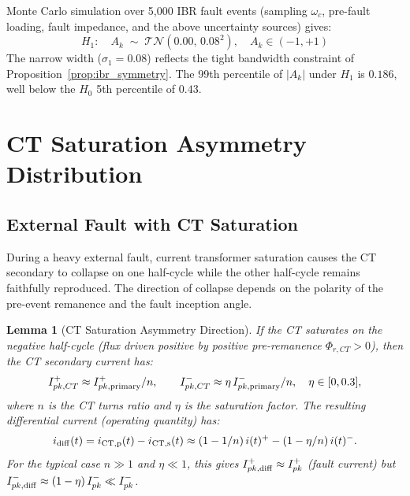 \documentclass[11pt, a4paper]{article}
\newtheorem{lemma}{Lemma}
\newcommand{\Ak}{A_k}
\newcommand{\TN}[2]{\mathcal{TN}(#1,\,#2)}
\begin{document}
Monte Carlo simulation over 5{,}000 IBR fault events (sampling $\omega_c$,
pre-fault loading, fault impedance, and the above uncertainty sources) gives:
\begin{equation}
  \boxed{H_1:\quad \Ak \;\sim\; \TN{0.00}{0.08^2},\quad \Ak \in (-1,+1)}
  \label{eq:H1_dist}
\end{equation}
The narrow width ($\sigma_1 = 0.08$) reflects the tight bandwidth constraint
of Proposition~\ref{prop:ibr_symmetry}.  The 99th percentile of $|A_k|$ under
$H_1$ is $0.186$, well below the $H_0$ 5th percentile of $0.43$.

\section{CT Saturation Asymmetry Distribution}
\label{sec:ct_saturation}

\subsection{External Fault with CT Saturation}

During a heavy external fault, current transformer saturation causes the CT
secondary to collapse on one half-cycle while the other half-cycle remains
faithfully reproduced.  The direction of collapse depends on the polarity of
the pre-event remanence and the fault inception angle.

\begin{lemma}[CT Saturation Asymmetry Direction]
If the CT saturates on the negative half-cycle (flux driven positive by
positive pre-remanence $\Phi_{r,CT} > 0$), then the CT secondary current has:
\begin{equation}
  I^+_{pk,CT} \approx I^+_{pk,\rm primary}/n, \qquad
  I^-_{pk,CT} \approx \eta\,I^-_{pk,\rm primary}/n, \quad \eta \in [0, 0.3],
  \label{eq:ct_sat}
\end{equation}
where $n$ is the CT turns ratio and $\eta$ is the saturation factor.  The
resulting differential current (operating quantity) has:
\begin{equation}
  i_{\rm diff}(t) = i_{\rm CT,p}(t) - i_{\rm CT,s}(t) \approx
  (1-1/n)\,i(t)^+ - (1-\eta/n)\,i(t)^-.
\end{equation}
For the typical case $n \gg 1$ and $\eta \ll 1$, this gives
$I^+_{pk,\rm diff} \approx I^+_{pk}$ (fault current) but
$I^-_{pk,\rm diff} \approx (1-\eta)\,I^-_{pk} \ll I^-_{pk}$.
\end{lemma}
\end{document}

